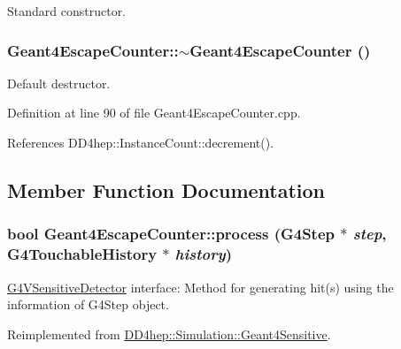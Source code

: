 Standard constructor. \hypertarget{class_d_d4hep_1_1_simulation_1_1_geant4_escape_counter_a5bfa77ab4c12efbfc6e311dcf0cc2d6f}{
\subsubsection[{$\sim$Geant4EscapeCounter}]{\setlength{\rightskip}{0pt plus 5cm}Geant4EscapeCounter::$\sim$Geant4EscapeCounter ()}}
\label{class_d_d4hep_1_1_simulation_1_1_geant4_escape_counter_a5bfa77ab4c12efbfc6e311dcf0cc2d6f}


Default destructor. 

Definition at line 90 of file Geant4EscapeCounter.cpp.

References DD4hep::InstanceCount::decrement().

\subsection{Member Function Documentation}
\hypertarget{class_d_d4hep_1_1_simulation_1_1_geant4_escape_counter_a869bbe150025b9798af6ab7487d225de}{
\subsubsection[{process}]{\setlength{\rightskip}{0pt plus 5cm}bool Geant4EscapeCounter::process (G4Step $\ast$ {\em step}, \/  G4TouchableHistory $\ast$ {\em history})}}
\label{class_d_d4hep_1_1_simulation_1_1_geant4_escape_counter_a869bbe150025b9798af6ab7487d225de}


\hyperlink{class_g4_v_sensitive_detector}{G4VSensitiveDetector} interface: Method for generating hit(s) using the information of G4Step object. 

Reimplemented from \hyperlink{class_d_d4hep_1_1_simulation_1_1_geant4_sensitive_a9a9463a6c29a66dad43a52ffc9f7838d}{DD4hep::Simulation::Geant4Sensitive}.

